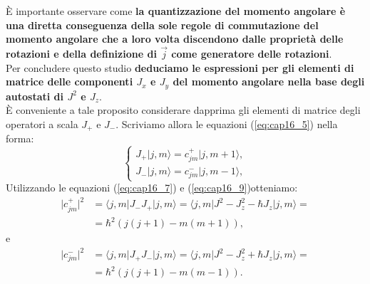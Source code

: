 È importante osservare come \textbf{la quantizzazione del momento angolare è una diretta conseguenza della sole regole di commutazione del momento  angolare che a loro volta discendono dalle proprietà delle rotazioni e della definizione di $\vec{j}$ come generatore delle rotazioni}.\\

Per concludere questo studio \textbf{deduciamo le espressioni per gli elementi di matrice delle componenti $J_x$ e $J_y$ del momento angolare nella base degli autostati di $J^2$ e $J_z$}.\\

È conveniente a tale proposito considerare dapprima gli elementi di matrice degli operatori a scala $J_+$ e $J_-$. Scriviamo allora le equazioni (\ref{eq:cap16_5}) nella forma:
	\begin{equation}
		\begin{cases}
			J_+\vert j, m \rangle = c_{jm} ^+\vert j, m+1 \rangle , \\
			J_-\vert j, m \rangle = c_{jm} ^-\vert j, m-1 \rangle ,
		\end{cases}
	\end{equation}
Utilizzando le equazioni (\ref{eq:cap16_7}) e (\ref{eq:cap16_9})otteniamo:
	\begin{align}
		\vert c_{jm} ^+\vert ^2 &= \langle j, m \vert J_- J_+\vert j, m \rangle = \langle j, m \vert J^2- J_z ^2 -\hbar J_z\vert j, m \rangle =\nonumber \\
		&= \hbar ^2 \left( j(j+1) - m (m+1)\right) ,
	\end{align}
e
	\begin{align}
		\vert c_{jm} ^-\vert ^2 &= \langle j, m \vert J_+ J_-\vert j, m \rangle = \langle j, m \vert J^2- J_z ^2 +\hbar J_z\vert j, m \rangle =\nonumber \\
		&= \hbar ^2 \left( j(j+1) - m (m-1)\right) .
	\end{align}\\
	
